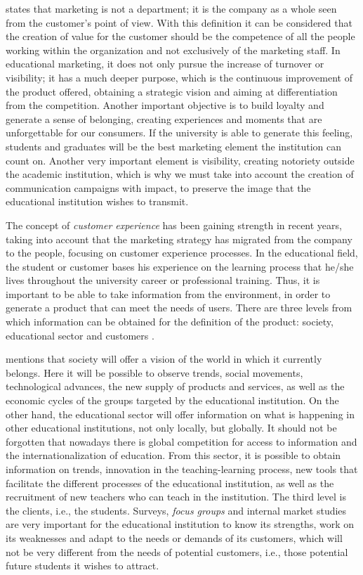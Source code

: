 \documentclass[english]{textolivre}
\begin{document}
\textcite{drucker_practice_1954} states that marketing is not a department; it is the company as a whole seen from the customer's point of view. With this definition it can be considered that the creation of value for the customer should be the competence of all the people working within the organization and not exclusively of the marketing staff. In educational marketing, it does not only pursue the increase of turnover or visibility; it has a much deeper purpose, which is the continuous improvement of the product offered, obtaining a strategic vision and aiming at differentiation from the competition. Another important objective is to build loyalty and generate a sense of belonging, creating experiences and moments that are unforgettable for our consumers. If the university is able to generate this feeling, students and graduates will be the best marketing element the institution can count on. Another very important element is visibility, creating notoriety outside the academic institution, which is why we must take into account the creation of communication campaigns with impact, to preserve the image that the educational institution wishes to transmit.

The concept of \textit{customer experience} has been gaining strength in recent years, taking into account that the marketing strategy has migrated from the company to the people, focusing on customer experience processes. In the educational field, the student or customer bases his experience on the learning process that he/she lives throughout the university career or professional training. Thus, it is important to be able to take information from the environment, in order to generate a product that can meet the needs of users. There are three levels from which information can be obtained for the definition of the product: society, educational sector and customers \cite{llorente_alonso_marketing_2017}.

\textcite{llorente_alonso_marketing_2017} mentions that society will offer a vision of the world in which it currently belongs. Here it will be possible to observe trends, social movements, technological advances, the new supply of products and services, as well as the economic cycles of the groups targeted by the educational institution. On the other hand, the educational sector will offer information on what is happening in other educational institutions, not only locally, but globally. It should not be forgotten that nowadays there is global competition for access to information and the internationalization of education. From this sector, it is possible to obtain information on trends, innovation in the teaching-learning process, new tools that facilitate the different processes of the educational institution, as well as the recruitment of new teachers who can teach in the institution. The third level is the clients, i.e., the students. Surveys, \textit{focus groups} and internal market studies are very important for the educational institution to know its strengths, work on its weaknesses and adapt to the needs or demands of its customers, which will not be very different from the needs of potential customers, i.e., those potential future students it wishes to attract.
\end{document}
